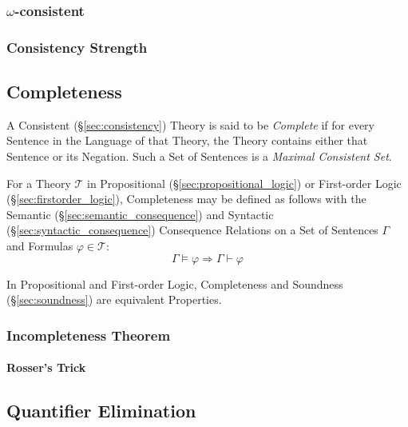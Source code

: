 \subsubsection{$\omega$-consistent}\label{sec:omega_consistent}

\subsubsection{Consistency Strength}\label{sec:consistency_strength}



\subsection{Completeness}\label{sec:completeness}

A Consistent (\S\ref{sec:consistency}) Theory is said to be
\emph{Complete} if for every Sentence in the Language of that Theory,
the Theory contains either that Sentence or its Negation. Such a Set
of Sentences is a \emph{Maximal Consistent Set}.

For a Theory $\mathcal{T}$ in Propositional
(\S\ref{sec:propositional_logic}) or First-order Logic
(\S\ref{sec:firstorder_logic}), Completeness may be defined as follows
with the Semantic (\S\ref{sec:semantic_consequence}) and Syntactic
(\S\ref{sec:syntactic_consequence}) Consequence Relations on a Set of
Sentences $\Gamma$ and Formulas $\varphi \in \mathcal{T}$:
\[
  \Gamma \vDash \varphi \Rightarrow \Gamma \vdash \varphi
\]

In Propositional and First-order Logic, Completeness and Soundness
(\S\ref{sec:soundness}) are equivalent Properties.



\subsubsection{Incompleteness Theorem}\label{sec:incompleteness_theorem}

\paragraph{Rosser's Trick}\label{sec:rossers_trick}\hfill



\subsection{Quantifier Elimination}\label{sec:quantifier_elimination}

